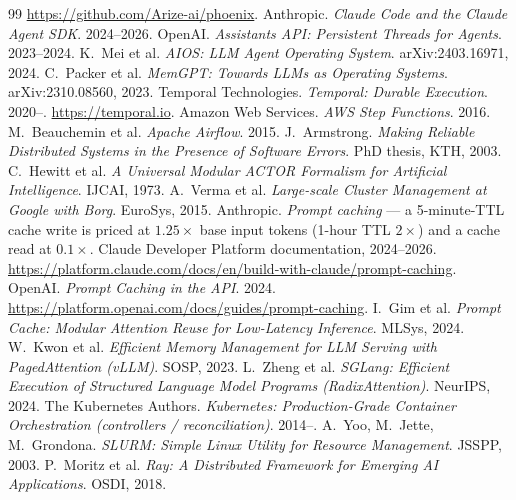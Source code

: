\documentclass[10pt,twocolumn]{article}
\begin{document}
\begin{thebibliography}{99}
\url{https://github.com/Arize-ai/phoenix}.
 Anthropic. \emph{Claude Code and the Claude Agent SDK}. 2024--2026.
 OpenAI. \emph{Assistants API: Persistent Threads for Agents}.
2023--2024.
 K.\ Mei et al. \emph{AIOS: LLM Agent Operating System}. arXiv:2403.16971,
2024.
 C.\ Packer et al. \emph{MemGPT: Towards LLMs as Operating Systems}.
arXiv:2310.08560, 2023.
 Temporal Technologies. \emph{Temporal: Durable Execution}. 2020--.
\url{https://temporal.io}.
 Amazon Web Services. \emph{AWS Step Functions}. 2016.
 M.\ Beauchemin et al. \emph{Apache Airflow}. 2015.
 J.\ Armstrong. \emph{Making Reliable Distributed Systems in the Presence
of Software Errors}. PhD thesis, KTH, 2003.
 C.\ Hewitt et al. \emph{A Universal Modular ACTOR Formalism for
Artificial Intelligence}. IJCAI, 1973.
 A.\ Verma et al. \emph{Large-scale Cluster Management at Google with
Borg}. EuroSys, 2015.
 Anthropic. \emph{Prompt caching} --- a 5-minute-TTL cache write is
priced at $1.25\times$ base input tokens (1-hour TTL $2\times$) and a cache read at
$0.1\times$. Claude Developer Platform documentation, 2024--2026.
\url{https://platform.claude.com/docs/en/build-with-claude/prompt-caching}.
 OpenAI. \emph{Prompt Caching in the API}. 2024.
\url{https://platform.openai.com/docs/guides/prompt-caching}.
 I.\ Gim et al. \emph{Prompt Cache: Modular Attention Reuse for
Low-Latency Inference}. MLSys, 2024.
 W.\ Kwon et al. \emph{Efficient Memory Management for LLM Serving with
PagedAttention (vLLM)}. SOSP, 2023.
 L.\ Zheng et al. \emph{SGLang: Efficient Execution of Structured
Language Model Programs (RadixAttention)}. NeurIPS, 2024.
 The Kubernetes Authors. \emph{Kubernetes: Production-Grade Container
Orchestration (controllers / reconciliation)}. 2014--.
 A.\ Yoo, M.\ Jette, M.\ Grondona. \emph{SLURM: Simple Linux Utility
for Resource Management}. JSSPP, 2003.
 P.\ Moritz et al. \emph{Ray: A Distributed Framework for Emerging AI
Applications}. OSDI, 2018.
\end{thebibliography}
\end{document}
